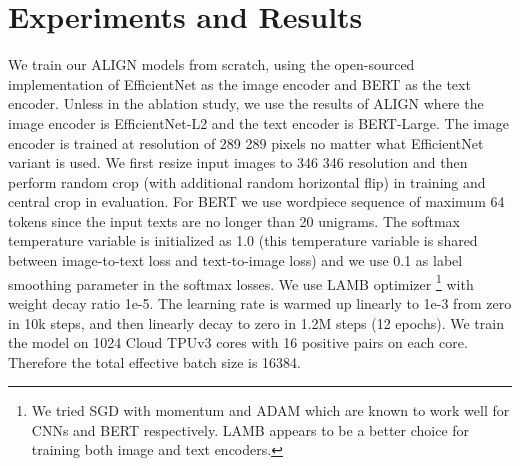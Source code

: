 \documentclass{article}
\begin{document}
\section{Experiments and Results}\label{sec:experiment_result}

We train our ALIGN models from scratch, using the open-sourced implementation of EfficientNet as the image encoder and BERT as the text encoder. Unless in the ablation study, 
we use the results of ALIGN where the image encoder is EfficientNet-L2 and the text encoder is BERT-Large.
The image encoder is trained at resolution of 289  289 pixels no matter what EfficientNet variant is used. We first resize input images to 346  346 resolution and then perform random crop (with additional random horizontal flip) in training and central crop in evaluation. For BERT we use wordpiece sequence of maximum 64 tokens since the input texts are no longer than 20 unigrams. The softmax temperature variable is initialized as 1.0 (this temperature variable is shared between image-to-text loss and text-to-image loss) and we use 0.1 as label smoothing parameter in the softmax losses. We use LAMB optimizer \cite{you:lamb}\footnote{We tried SGD with momentum and ADAM which are known to work well for CNNs and BERT respectively. LAMB appears to be a better choice for training both image and text encoders.} with weight decay ratio 1e-5. The learning rate is warmed up linearly to 1e-3 from zero in 10k steps, and then linearly decay to zero in 1.2M steps (12 epochs). We train the model on 1024 Cloud TPUv3 cores with 16 positive pairs on each core. Therefore the total effective batch size is 16384.
\end{document}
